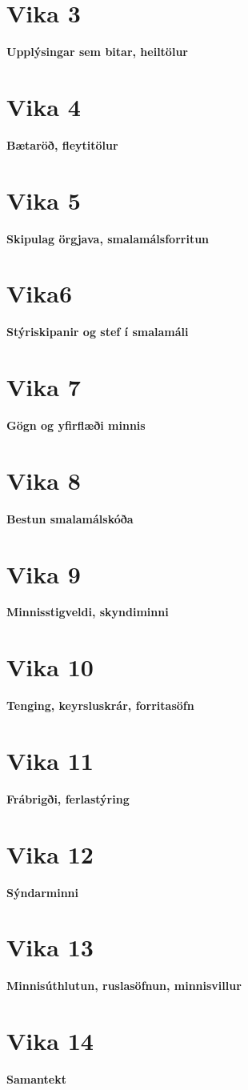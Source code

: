 \documentclass{article}
\begin{document}
\newpage
\section{Vika 3}
\large{\textbf{Upplýsingar sem bitar, heiltölur}}

\newpage
\section{Vika 4}
\large{\textbf{Bætaröð, fleytitölur}}

\newpage
\section{Vika 5}
\large{\textbf{Skipulag örgjava, smalamálsforritun}}

\newpage
\section{Vika6}
\large{\textbf{Stýriskipanir og stef í smalamáli}}

\newpage
\section{Vika 7}
\large{\textbf{Gögn og yfirflæði minnis}}

\newpage
\section{Vika 8}
\large{\textbf{Bestun smalamálskóða}}

\newpage
\section{Vika 9}
\large{\textbf{Minnisstigveldi, skyndiminni}}

\newpage
\section{Vika 10}
\large{\textbf{Tenging, keyrsluskrár, forritasöfn}}

\newpage
\section{Vika 11}
\large{\textbf{Frábrigði, ferlastýring}}

\newpage
\section{Vika 12}
\large{\textbf{Sýndarminni}}

\newpage
\section{Vika 13}
\large{\textbf{Minnisúthlutun, ruslasöfnun, minnisvillur}}

\newpage
\section{Vika 14}
\large{\textbf{Samantekt}}
\end{document}
